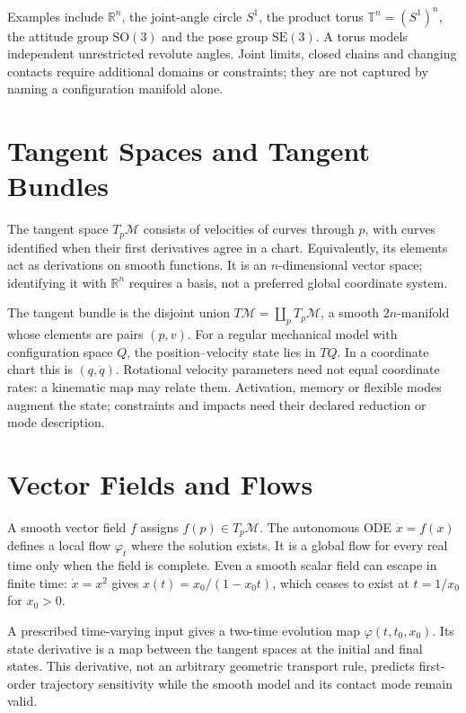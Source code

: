 \documentclass[10pt,letterpaper,openany]{book}
\theoremstyle{plain}
\theoremstyle{definition}
\theoremstyle{remark}
\renewcommand{\R}{\mathbb{R}}
\renewcommand{\SO}{\mathrm{SO}}
\renewcommand{\SE}{\mathrm{SE}}
\begin{document}
Examples include $\R^n$, the joint-angle circle $S^1$, the product torus
$\mathbb T^n=(S^1)^n$, the attitude group $\SO(3)$ and the pose group $\SE(3)$.
A torus models independent unrestricted revolute angles. Joint limits, closed
chains and changing contacts require additional domains or constraints; they
are not captured by naming a configuration manifold alone.

\section{Tangent Spaces and Tangent Bundles}

The tangent space $T_p\mathcal M$ consists of velocities of curves through $p$,
with curves identified when their first derivatives agree in a chart. Equivalently,
its elements act as derivations on smooth functions. It is an $n$-dimensional
vector space; identifying it with $\R^n$ requires a basis, not a preferred global
coordinate system.

The tangent bundle is the disjoint union $T\mathcal M=\coprod_pT_p\mathcal M$,
a smooth $2n$-manifold whose elements are pairs $(p,v)$. For a regular mechanical
model with configuration space $Q$, the position--velocity state lies in $TQ$.
In a coordinate chart this is $(q,\dot q)$. Rotational velocity parameters need
not equal coordinate rates: a kinematic map may relate them. Activation, memory
or flexible modes augment the state; constraints and impacts need their declared
reduction or mode description.

\section{Vector Fields and Flows}

A smooth vector field $f$ assigns $f(p)\in T_p\mathcal M$. The autonomous ODE
$\dot x=f(x)$ defines a local flow $\varphi_t$ where the solution exists. It is a
global flow for every real time only when the field is complete. Even a smooth
scalar field can escape in finite time: $\dot x=x^2$ gives
$x(t)=x_0/(1-x_0t)$, which ceases to exist at $t=1/x_0$ for $x_0>0$.

A prescribed time-varying input gives a two-time evolution map
$\varphi(t,t_0,x_0)$. Its state derivative is a map between the tangent spaces at
the initial and final states. This derivative, not an arbitrary geometric
transport rule, predicts first-order trajectory sensitivity while the smooth
model and its contact mode remain valid.
\end{document}
